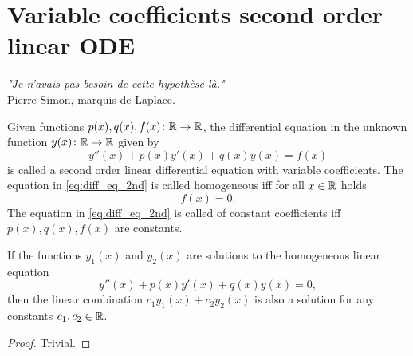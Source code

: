 \section{Variable coefficients second order linear ODE}
\begin{flushright}
	\emph{"Je n'avais pas besoin de cette hypothèse-là."}\\ 
	
	Pierre-Simon, marquis de Laplace.
\end{flushright}
\label{sec:ODE_2nd}
Given functions $ p(x), q(x), f(x)\colon \mathbb{R}\to \mathbb{R} $, the differential equation in the unknown function $ y(x)\colon \mathbb{R}\to \mathbb{R} $ given by
\begin{equation}
y''(x)+p(x)y'(x)+q(x)y(x)=f(x)
\label{eq:diff_eq_2nd}
\end{equation}
is called a second order linear differential equation with variable coefficients. The equation in \eqref{eq:diff_eq_2nd} is called homogeneous iff for all $ x\in \mathbb{R} $ holds
\[f(x)=0. \]
The equation in \eqref{eq:diff_eq_2nd} is called of constant coefficients iff $ p(x), q(x), f(x) $ are constants.
\begin{thm}
	If the functions $ y_1(x) $ and $ y_2(x) $ are solutions to the homogeneous linear equation
	\begin{equation}
	y''(x)+p(x)y'(x)+q(x)y(x)=0,
	\end{equation}
	then the linear combination $ c_1y_1(x)+c_2y_2(x) $ is also a solution for any constants $ c_1,c_2\in \mathbb{R} $.
\end{thm}
\begin{proof}
	Trivial.
\end{proof}
